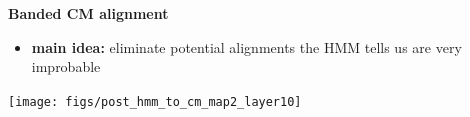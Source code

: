 \documentclass[landscape]{slides}
\begin{document}
\begin{slide}
\begin{center}
\large
\textbf{Banded CM alignment}
\end{center}
\medskip
\small
\begin{itemize}
\item
\textbf{main idea:} eliminate potential alignments the HMM tells us are very improbable
\end{itemize}
\begin{center}
\texttt{[image: figs/post\_hmm\_to\_cm\_map2\_layer10]}
\end{center}
\vfill
\end{slide}
\end{document}
